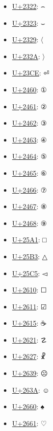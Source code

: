 \begin{itemize}
	\item \href{https://decodeunicode.org/en/u+2322}{U+2322}: ⌢
	\item \href{https://decodeunicode.org/en/u+2323}{U+2323}: ⌣
	\item \href{https://decodeunicode.org/en/u+2329}{U+2329}: 〈
	\item \href{https://decodeunicode.org/en/u+232A}{U+232A}: 〉
	\item \href{https://decodeunicode.org/en/u+23CE}{U+23CE}: ⏎
	\item \href{https://decodeunicode.org/en/u+2460}{U+2460}: ①
	\item \href{https://decodeunicode.org/en/u+2461}{U+2461}: ②
	\item \href{https://decodeunicode.org/en/u+2462}{U+2462}: ③
	\item \href{https://decodeunicode.org/en/u+2463}{U+2463}: ④
	\item \href{https://decodeunicode.org/en/u+2464}{U+2464}: ⑤
	\item \href{https://decodeunicode.org/en/u+2465}{U+2465}: ⑥
	\item \href{https://decodeunicode.org/en/u+2466}{U+2466}: ⑦
	\item \href{https://decodeunicode.org/en/u+2467}{U+2467}: ⑧
	\item \href{https://decodeunicode.org/en/u+2468}{U+2468}: ⑨
	\item \href{https://decodeunicode.org/en/u+25A1}{U+25A1}: □
	\item \href{https://decodeunicode.org/en/u+25B3}{U+25B3}: △
	\item \href{https://decodeunicode.org/en/u+25C5}{U+25C5}: ◅
	\item \href{https://decodeunicode.org/en/u+2610}{U+2610}: ☐
	\item \href{https://decodeunicode.org/en/u+2611}{U+2611}: ☑
	\item \href{https://decodeunicode.org/en/u+2615}{U+2615}: ☕
	\item \href{https://decodeunicode.org/en/u+2621}{U+2621}: ☡
	\item \href{https://decodeunicode.org/en/u+2627}{U+2627}: ☧
	\item \href{https://decodeunicode.org/en/u+2639}{U+2639}: ☹
	\item \href{https://decodeunicode.org/en/u+263A}{U+263A}: ☺
	\item \href{https://decodeunicode.org/en/u+2660}{U+2660}: ♠
	\item \href{https://decodeunicode.org/en/u+2661}{U+2661}: ♡

\end{itemize}
